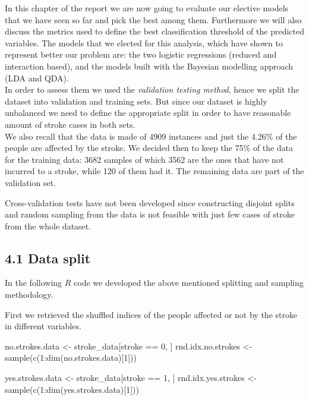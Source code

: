 \documentclass[
]{article}
\newenvironment{Shaded}{\begin{snugshade}}{\end{snugshade}}
\newcommand{\DecValTok}[1]{\textcolor[rgb]{0.00,0.00,0.81}{#1}}
\newcommand{\FunctionTok}[1]{\textcolor[rgb]{0.00,0.00,0.00}{#1}}
\newcommand{\NormalTok}[1]{#1}
\newcommand{\OtherTok}[1]{\textcolor[rgb]{0.56,0.35,0.01}{#1}}
\newcommand{\SpecialCharTok}[1]{\textcolor[rgb]{0.00,0.00,0.00}{#1}}
\begin{document}
In this chapter of the report we are now going to evaluate our elective
models that we have seen so far and pick the best among them.
Furthermore we will also discuss the metrics used to define the best
classification threshold of the predicted variables. The models that we
elected for this analysis, which have shown to represent better our
problem are: the two logistic regressions (reduced and interaction
based), and the models built with the Bayesian modelling approach (LDA
and QDA).\\
In order to assess them we used the \emph{validation testing method},
hence we split the dataset into validation and training sets. But since
our dataset is highly unbalanced we need to define the appropriate split
in order to have reasonable amount of stroke cases in both sets.\\
We also recall that the data is made of 4909 instances and just the
4.26\% of the people are affected by the stroke. We decided then to keep
the 75\% of the data for the training data: 3682 samples of which 3562
are the ones that have not incurred to a stroke, while 120 of them had
it. The remaining data are part of the validation set.

Cross-validation tests have not been developed since constructing
disjoint splits and random sampling from the data is not feasible with
just few cases of stroke from the whole dataset.

\hypertarget{data-split}{%
\subsection{4.1 Data split}\label{data-split}}

In the following \(R\) code we developed the above mentioned splitting
and sampling methodology.

First we retrieved the shuffled indices of the people affected or not by
the stroke in different variables.

\begin{Shaded}
\begin{Highlighting}[]
\NormalTok{no.strokes.data }\OtherTok{\textless{}{-}}\NormalTok{ stroke\_data[stroke }\SpecialCharTok{==} \DecValTok{0}\NormalTok{, ]}
\NormalTok{rnd.idx.no.strokes }\OtherTok{\textless{}{-}} \FunctionTok{sample}\NormalTok{(}\FunctionTok{c}\NormalTok{(}\DecValTok{1}\SpecialCharTok{:}\FunctionTok{dim}\NormalTok{(no.strokes.data)[}\DecValTok{1}\NormalTok{]))}

\NormalTok{yes.strokes.data }\OtherTok{\textless{}{-}}\NormalTok{ stroke\_data[stroke }\SpecialCharTok{==} \DecValTok{1}\NormalTok{, ]}
\NormalTok{rnd.idx.yes.strokes }\OtherTok{\textless{}{-}} \FunctionTok{sample}\NormalTok{(}\FunctionTok{c}\NormalTok{(}\DecValTok{1}\SpecialCharTok{:}\FunctionTok{dim}\NormalTok{(yes.strokes.data)[}\DecValTok{1}\NormalTok{]))}
\end{Highlighting}
\end{Shaded}
\end{document}

